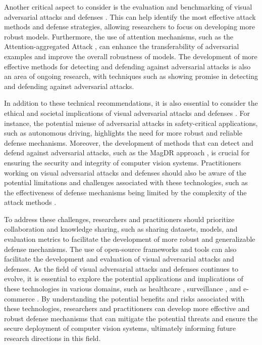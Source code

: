 \documentclass[11pt]{article}
\begin{document}
Another critical aspect to consider is the evaluation and benchmarking of visual adversarial attacks and defenses \cite{ref29}. This can help identify the most effective attack methods and defense strategies, allowing researchers to focus on developing more robust models. Furthermore, the use of attention mechanisms, such as the Attention-aggregated Attack \cite{ref24}, can enhance the transferability of adversarial examples and improve the overall robustness of models. The development of more effective methods for detecting and defending against adversarial attacks is also an area of ongoing research, with techniques such as \cite{ref168} showing promise in detecting and defending against adversarial attacks.

In addition to these technical recommendations, it is also essential to consider the ethical and societal implications of visual adversarial attacks and defenses \cite{ref113}. For instance, the potential misuse of adversarial attacks in safety-critical applications, such as autonomous driving, highlights the need for more robust and reliable defense mechanisms. Moreover, the development of methods that can detect and defend against adversarial attacks, such as the MagDR approach \cite{ref175}, is crucial for ensuring the security and integrity of computer vision systems. Practitioners working on visual adversarial attacks and defenses should also be aware of the potential limitations and challenges associated with these technologies, such as the effectiveness of defense mechanisms being limited by the complexity of the attack methods \cite{ref10}.

To address these challenges, researchers and practitioners should prioritize collaboration and knowledge sharing, such as sharing datasets, models, and evaluation metrics to facilitate the development of more robust and generalizable defense mechanisms. The use of open-source frameworks and tools can also facilitate the development and evaluation of visual adversarial attacks and defenses. As the field of visual adversarial attacks and defenses continues to evolve, it is essential to explore the potential applications and implications of these technologies in various domains, such as healthcare \cite{ref174}, surveillance \cite{ref113}, and e-commerce \cite{ref176}. By understanding the potential benefits and risks associated with these technologies, researchers and practitioners can develop more effective and robust defense mechanisms that can mitigate the potential threats and ensure the secure deployment of computer vision systems, ultimately informing future research directions in this field.
\end{document}
